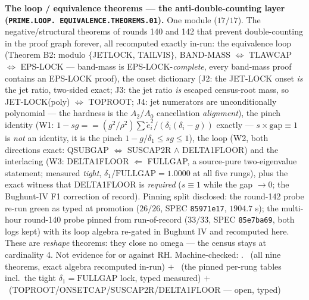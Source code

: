 \documentclass[11pt,a4paper]{article}
\theoremstyle{definition}
\begin{document}
\par\smallskip\noindent\textbf{The loop / equivalence theorems
--- the anti-double-counting layer
(\texttt{PRIME.\allowbreak LOOP.\allowbreak
EQUIVALENCE.\allowbreak THEOREMS.01}).}
One module ($17/17$).  The negative/structural theorems of
rounds 140 and 142 that prevent double-counting in the proof
graph forever, all recomputed exactly in-run: the equivalence
loop (Theorem B2: modulo $\{$JETLOCK, TAILVIS$\}$,
BAND-MASS $\Leftrightarrow$ TLAWCAP $\Leftrightarrow$ EPS-LOCK
--- band-mass is EPS-LOCK-\emph{complete}, every band-mass proof
contains an EPS-LOCK proof), the onset dictionary (J2: the
JET-LOCK onset \emph{is} the jet ratio, two-sided exact; J3: the
jet ratio \emph{is} escaped census-root mass, so
JET-LOCK(poly) $\Leftrightarrow$ TOPROOT; J4: jet numerators are
unconditionally polynomial --- the hardness is the $A_2/A_0$
cancellation \emph{alignment}), the pinch identity (W1:
$1 - sg == (g^2/\rho^2)\sum \tilde e_i^2/(\delta_i(\delta_i-g))$
exactly --- $s \times \mathrm{gap} \equiv 1$ is \emph{not} an
identity, it is the pinch $1 - g/\delta_1 \le sg \le 1$), the
loop (W2, both directions exact:
QSUBGAP $\Leftrightarrow$ SUSCAP2R $\wedge$ DELTA1FLOOR) and the
interlacing (W3: DELTA1FLOOR $\Leftarrow$ FULLGAP, a source-pure
two-eigenvalue statement; measured \emph{tight},
$\delta_1/\mathrm{FULLGAP} = 1.0000$ at all five rungs), plus
the exact witness that DELTA1FLOOR is \emph{required} ($s \equiv
1$ while the gap $\to 0$; the Bughunt-IV F1 correction of
record).  Pinning split disclosed: the round-142 probe re-run
green as typed at promotion ($26/26$, SPEC \texttt{85971e17},
$1904.7$ s); the multi-hour round-140 probe pinned from
run-of-record ($33/33$, SPEC \texttt{85e7ba69}, both logs kept)
with its loop algebra re-gated in Bughunt IV and recomputed
here.  These are \emph{reshape} theorems: they close no omega
--- the census stays at cardinality 4.  Not evidence for or
against RH.
Machine-checked: .
\mE\ (all nine theorems, exact algebra recomputed in-run) $+$
\mC\ (the pinned per-rung tables incl.\ the tight
$\delta_1 = \mathrm{FULLGAP}$ lock, typed measured) $+$ \mO\
(TOPROOT/ONSETCAP/SUSCAP2R/DELTA1FLOOR --- open, typed)
\par\smallskip
\end{document}
